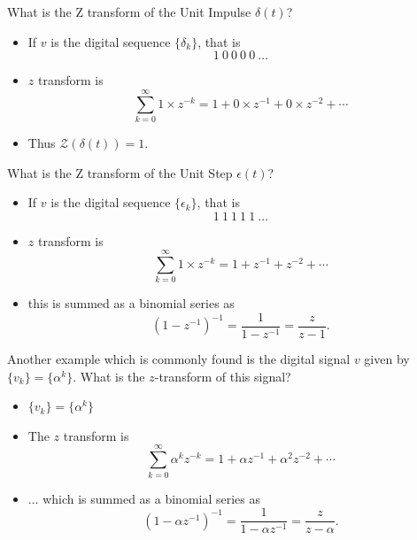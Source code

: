 \begin{slide}\label{slide:l8s1a1a}

What is the Z transform of the Unit Impulse $\delta(t)$?

\end{slide}

\begin{itemize}

\item If $v$ is the digital sequence $\{\delta_k\}$, that is
\[1\ 0\ 0\ 0\ 0\ \ldots\]

\item $z$ transform is
\[\sum_{k=0}^{\infty} 1\times z^{-k} = 1 + 0\times z^{-1} + 0\times z^{-2}+\cdots\]

\item Thus $\mathcal{Z}(\delta(t)) = 1$.

\end{itemize}

\begin{slide}\label{slide:l8s1a1}

What is the Z transform of the Unit Step $\epsilon(t)$?

\end{slide}

\begin{itemize}

\item If $v$ is the digital sequence $\{\epsilon_k\}$, that is
\[1\ 1\ 1\ 1\ 1\ \ldots\]

\item $z$ transform is
\[\sum_{k=0}^{\infty} 1\times z^{-k} = 1 + z^{-1} + z^{-2}+\cdots\]

\item this is summed
as a binomial series as \[(1-z^{-1})^{-1} = \frac{1}{1-z^{-1}} =
\frac{z}{z-1}.\]

\end{itemize}

\begin{slide}\label{slide:l8s1b}

Another example which is commonly found is the digital signal $v$
given by $\{v_k\} = \{\alpha^k\}$. What is the $z$-transform of this signal?

\end{slide}

\begin{itemize}

\item $\{v_k\} = \{\alpha^k\}$

\item The $z$ transform is
\[\sum_{k=0}^{\infty} \alpha^{k} z^{-k} = 1 + \alpha z^{-1} + \alpha^2
z^{-2}+\cdots\]

\item $\ldots$ which is summed as a binomial series as
\[(1-\alpha z^{-1})^{-1} = \frac{1}{1-\alpha
  z^{-1}} = \frac{z}{z-\alpha}.\]

\end{itemize}

